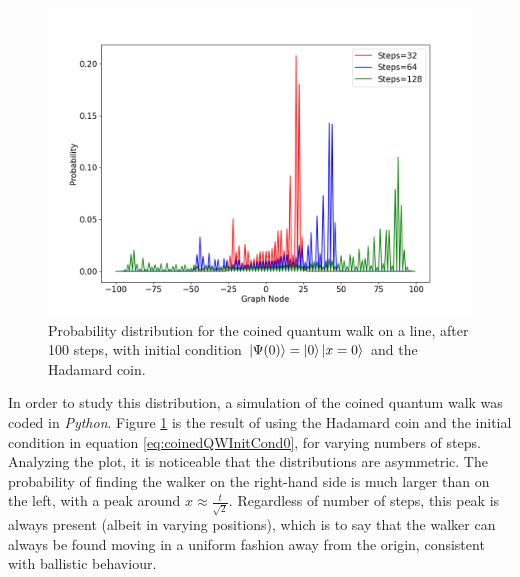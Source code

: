 \documentclass[../../dissertation.tex]{subfiles}
\begin{document}
\begin{figure}[!h]
	\centering
	\includegraphics[scale=0.40]{img/CoinedQuantumWalk/CoinedMultiple_psi0_3264128.png}
	\caption{Probability distribution for the coined quantum walk on a line, after 100 steps, with initial condition $\ket{\Psi(0)}=\ket{0}\ket{x=0}$ and the Hadamard coin.} 
	\label{fig:coinedQWDist0}
\end{figure}
In order to study this distribution, a simulation of the coined quantum walk
was coded in \textit{Python}. Figure \ref{fig:coinedQWDist0} is the result of
using the Hadamard coin and the initial condition in equation
\ref{eq:coinedQWInitCond0}, for varying numbers of steps. Analyzing the plot,
it is noticeable that the distributions are asymmetric. The probability of
finding the walker on the right-hand side is much larger than on the left, with
a peak around $x \approx \frac{t}{\sqrt{2}}$. Regardless of number of steps,
this peak is always present (albeit in varying positions), which is to say that
the walker can always be found moving in a uniform fashion away from the
origin, consistent with ballistic behaviour.\par 
\end{document}
